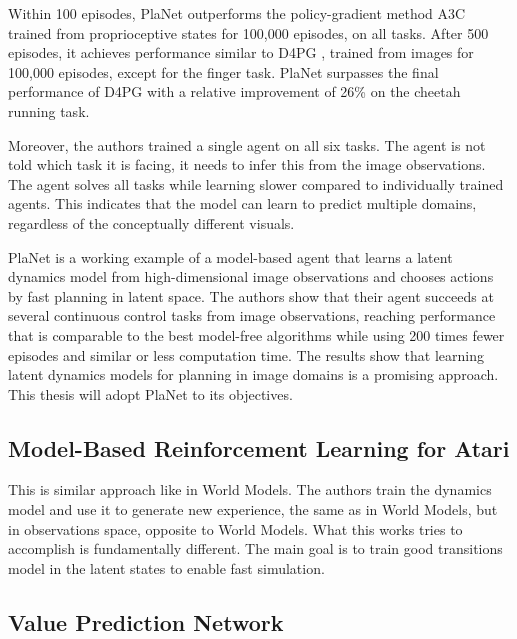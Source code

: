 Within 100 episodes, PlaNet outperforms the policy-gradient method A3C \cite{Algo.A3C} trained from proprioceptive states for 100,000 episodes, on all tasks. After 500 episodes, it achieves performance similar to D4PG \cite{Algo.D4PG}, trained from images for 100,000 episodes, except for the finger task. PlaNet surpasses the final performance of D4PG with a relative improvement of 26\% on the cheetah running task.

Moreover, the authors trained a single agent on all six tasks. The agent is not told which task it is facing, it needs to infer this from the image observations. The agent solves all tasks while learning slower compared to individually trained agents. This indicates that the model can learn to predict multiple domains, regardless of the conceptually different visuals.

PlaNet is a working example of a model-based agent that learns a latent dynamics model from high-dimensional image observations and chooses actions by fast planning in latent space. The authors show that their agent succeeds at several continuous control tasks from image observations, reaching performance that is comparable to the best model-free algorithms while using 200 times fewer episodes and similar or less computation time. The results show that learning latent dynamics models for planning in image domains is a promising approach. This thesis will adopt PlaNet to its objectives.

\subsection{Model-Based Reinforcement Learning for Atari}



This is similar approach like in World Models. The authors train the dynamics model and use it to generate new experience, the same as in World Models, but in observations space, opposite to World Models. What this works tries to accomplish is fundamentally different. The main goal is to train good transitions model in the latent states to enable fast simulation. 

\subsection{Value Prediction Network}

